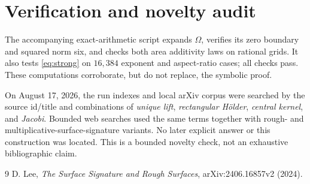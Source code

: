 \documentclass[11pt]{article}
\theoremstyle{remark}
\begin{document}
\section{Verification and novelty audit}

The accompanying exact-arithmetic script expands $\Omega$, verifies its zero
boundary and squared norm six, and checks both area additivity laws on
rational grids.  It also tests \eqref{eq:strong} on $16{,}384$ exponent and
aspect-ratio cases; all checks pass.  These computations corroborate, but do
not replace, the symbolic proof.

On August 17, 2026, the run indexes and local arXiv corpus were searched by
the source id/title and combinations of \emph{unique lift}, \emph{rectangular
Hölder}, \emph{central kernel}, and \emph{Jacobi}.  Bounded web searches used
the same terms together with rough- and multiplicative-surface-signature
variants.  No later explicit answer or this construction was located.  This
is a bounded novelty check, not an exhaustive bibliographic claim.

\begin{thebibliography}{9}
D. Lee,
\emph{The Surface Signature and Rough Surfaces},
arXiv:2406.16857v2 (2024).
\end{thebibliography}
\end{document}
